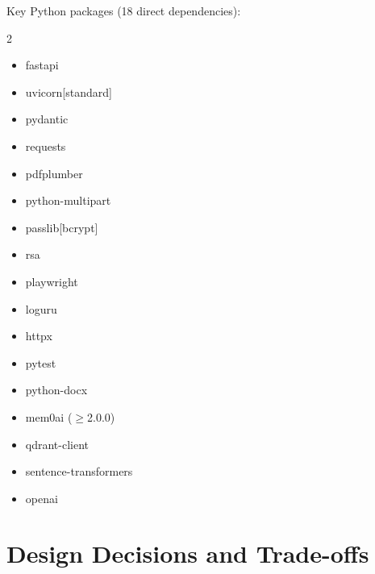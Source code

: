 \documentclass[12pt,a4paper]{article}
\begin{document}
Key Python packages (18 direct dependencies):
\begin{multicols}{2}
\begin{itemize}[nosep]
    \item fastapi
    \item uvicorn[standard]
    \item pydantic
    \item requests
    \item pdfplumber
    \item python-multipart
    \item passlib[bcrypt]
    \item rsa
    \item playwright
    \item loguru
    \item httpx
    \item pytest
    \item python-docx
    \item mem0ai ($\geq$2.0.0)
    \item qdrant-client
    \item sentence-transformers
    \item openai
\end{itemize}
\end{multicols}

\section{Design Decisions and Trade-offs}
\label{sec:decisions}
\end{document}
